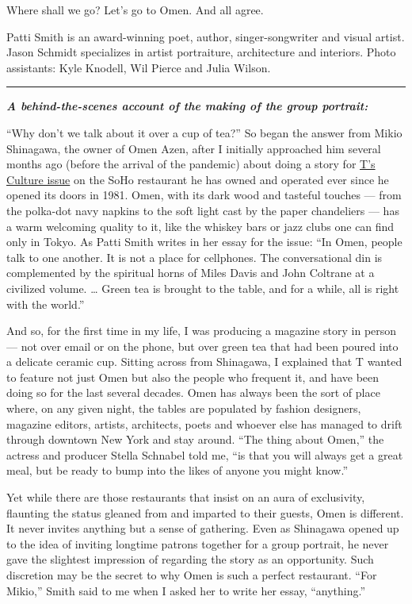 Where shall we go? Let's go to Omen. And all agree.

Patti Smith is an award-winning poet, author, singer-songwriter and
visual artist. Jason Schmidt specializes in artist portraiture,
architecture and interiors. Photo assistants: Kyle Knodell, Wil Pierce
and Julia Wilson.

\begin{center}\rule{0.5\linewidth}{\linethickness}\end{center}

\emph{\textbf{A behind-the-scenes account of the making of the group
portrait:}}

``Why don't we talk about it over a cup of tea?'' So began the answer
from Mikio Shinagawa, the owner of Omen Azen, after I initially
approached him several months ago (before the arrival of the pandemic)
about doing a story for
\href{https://www.nytimes.com/interactive/2020/04/13/t-magazine/culture-issue-2020.html}{T's
Culture issue} on the SoHo restaurant he has owned and operated ever
since he opened its doors in 1981. Omen, with its dark wood and tasteful
touches --- from the polka-dot navy napkins to the soft light cast by
the paper chandeliers --- has a warm welcoming quality to it, like the
whiskey bars or jazz clubs one can find only in Tokyo. As Patti Smith
writes in her essay for the issue: ``In Omen, people talk to one
another. It is not a place for cellphones. The conversational din is
complemented by the spiritual horns of Miles Davis and John Coltrane at
a civilized volume. \ldots{} Green tea is brought to the table, and for
a while, all is right with the world.''

​And so, for the first time in my life, I was producing a magazine story
in person --- not over email or on the phone, but over green tea that
had been poured into a delicate ceramic cup. Sitting across from
Shinagawa, I explained that T wanted to feature not just Omen but also
the people who frequent it, and have been doing so for the last several
decades. Omen has always been the sort of place where, on any given
night, the tables are populated by fashion designers, magazine editors,
artists, architects, poets and whoever else has managed to drift through
downtown New York and stay around. ``The thing about Omen,'' the actress
and producer Stella Schnabel told me, ``is that you will always get a
great meal, but be ready to bump into the likes of anyone you might
know.''

Yet while there are those restaurants that insist on an aura of
exclusivity, flaunting the status gleaned from and imparted to their
guests, Omen is different. It never invites anything but a sense of
gathering. Even as Shinagawa opened up to the idea of inviting longtime
patrons together for a group portrait, he never gave the slightest
impression of regarding the story as an opportunity. Such discretion may
be the secret to why Omen is such a perfect restaurant. ``For Mikio,''
Smith said to me when I asked her to write her essay, ``anything.''

